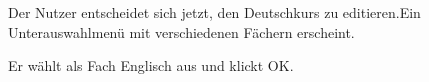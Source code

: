 \documentclass{swp1}
\begin{document}
\begin{figure}
\caption{Der Nutzer entscheidet sich jetzt, den Deutschkurs zu editieren.Ein Unterauswahlmenü mit verschiedenen Fächern erscheint. }
\label{ab8}
\end{figure}

\begin{figure}
\caption{Er wählt als Fach Englisch aus und klickt OK. }
\label{ab9}
\end{figure}
\end{document}
